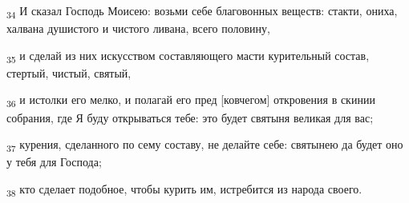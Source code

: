 \begin{tcolorbox}
\textsubscript{34} И сказал Господь Моисею: возьми себе благовонных веществ: стакти, ониха, халвана душистого и чистого ливана, всего половину,
\end{tcolorbox}
\begin{tcolorbox}
\textsubscript{35} и сделай из них искусством составляющего масти курительный состав, стертый, чистый, святый,
\end{tcolorbox}
\begin{tcolorbox}
\textsubscript{36} и истолки его мелко, и полагай его пред [ковчегом] откровения в скинии собрания, где Я буду открываться тебе: это будет святыня великая для вас;
\end{tcolorbox}
\begin{tcolorbox}
\textsubscript{37} курения, сделанного по сему составу, не делайте себе: святынею да будет оно у тебя для Господа;
\end{tcolorbox}
\begin{tcolorbox}
\textsubscript{38} кто сделает подобное, чтобы курить им, истребится из народа своего.
\end{tcolorbox}
